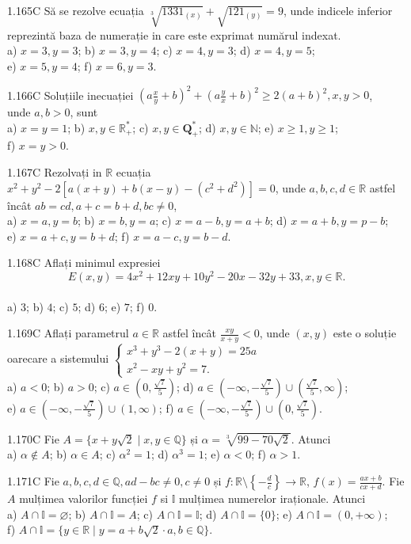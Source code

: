 \documentclass[11pt]{article}
\begin{document}
1.165C Să se rezolve ecuația $\sqrt[3]{1331_{(x)}}+\sqrt{121_{(y)}}=9$, unde indicele inferior reprezintă baza de numerație in care este exprimat numărul indexat.\\ a) $x=3, y=3$; b) $x=3, y=4$; c) $x=4, y=3$; d) $x=4, y=5$;\\ e) $x=5, y=4$; f) $x=6, y=3$. 

1.166C Soluțiile inecuației $\left(a \frac{x}{y}+b\right)^{2}+\left(a \frac{y}{x}+b\right)^{2} \geq 2(a+b)^{2}, x, y >0$,\\ unde $a, b>0$, sunt\\ a) $x=y=1$; b) $x, y \in \mathbb{R}_{+}^{*}$; c) $x, y \in \mathbf{Q}_{+}^{*}$; d) $x, y \in \mathbb{N}$; e) $x \geq 1, y \geq 1$;\\ f) $x=y>0$.

1.167C Rezolvați in $\mathbb{R}$ ecuația $x^{2}+y^{2}-2\left[a(x+y)+b(x-y)-\left(c^{2}+d^{2}\right)\right]=0$, unde $a, b, c, d \in \mathbb{R}$ astfel încât $a b=c d, a+c=b+d, b c \neq 0$,\\ a) $x=a, y=b$; b) $x=b, y=a$; c) $x=a-b, y=a+b$; d) $x=a+b, y=p-b$;\\ e) $x=a+c, y=b+d$; f) $x=a-c, y=b-d$.

1.168C Aflați minimul expresiei $$E(x, y)=4 x^{2}+12 x y+10 y^{2}-20 x-32 y+33, x, y \in \mathbb{R}.$$\\ a) $3$; b) $4$; c) $5$; d) $6$; e) $7$; f) $0$.

1.169C Aflați parametrul $a \in \mathbb{R}$ astfel încât $\frac{x y}{x+y}<0$, unde $(x, y)$ este o soluție oarecare a sistemului $\left\{\begin{array}{l}x^{3}+y^{3}-2(x+y)=25 a \\ x^{2}-x y+y^{2}=7 .\end{array}\right.$\\ a) $a<0$; b) $a>0$; c) $a \in\left(0, \frac{\sqrt{7}}{5}\right)$; d) $a \in\left(-\infty,-\frac{\sqrt{7}}{5}\right) \cup\left(\frac{\sqrt{7}}{5}, \infty\right)$;\\ e) $a \in\left(-\infty,-\frac{\sqrt{7}}{5}\right) \cup(1, \infty)$; f) $a \in\left(-\infty,-\frac{\sqrt{7}}{5}\right) \cup\left(0, \frac{\sqrt{7}}{5}\right)$.

1.170C Fie $A=\{x+y \sqrt{2} \mid x, y \in \mathbb{Q}\}$ și $\alpha=\sqrt[3]{99-70 \sqrt{2}}$. Atunci\\ a) $\alpha \notin A$; b) $\alpha \in A$; c) $\alpha^{2}=1$; d) $\alpha^{3}=1$; e) $\alpha<0$; f) $\alpha>1$.

1.171C Fie $a, b, c, d \in \mathbb{Q}, a d-b c \neq 0, c \neq 0$ și $f: \mathbb{R} \setminus\left\{-\frac{d}{c}\right\} \rightarrow \mathbb{R}$, $f(x)=\frac{a x+b}{c x+d}$. Fie $A$ mulțimea valorilor funcției $f$ si $\mathbb{I}$ mulțimea numerelor iraționale. Atunci\\ a) $A \cap \mathbb{I}=\varnothing$; b) $A \cap \mathbb{I}=A$; c) $A \cap \mathbb{I}=\mathbb{I}$; d) $A \cap \mathbb{I}=\{0\}$; e) $A \cap \mathbb{I}=(0,+\infty)$;\\ f) $A \cap \mathbb{I}=\{y \in \mathbb{R} \mid y=a+b \sqrt{2} \cdot a, b \in \mathbb{Q}\}$.
\end{document}
